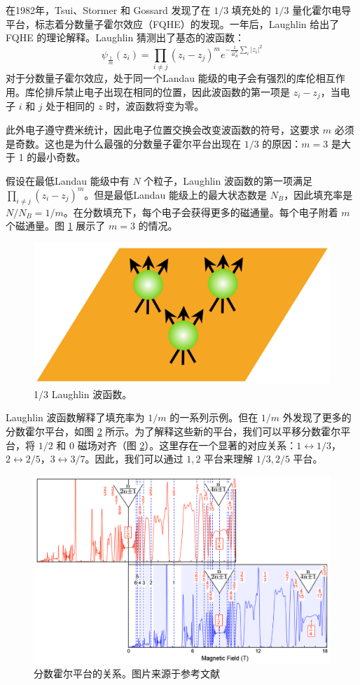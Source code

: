 在1982年，Tsui、Stormer 和 Gossard 发现了在 $1/3$ 填充处的 $1/3$ 量化霍尔电导平台\cite{PhysRevLett.48.1559}，标志着分数量子霍尔效应（FQHE）的发现。一年后，Laughlin 给出了 FQHE 的理论解释\cite{PhysRevLett.50.1395}。Laughlin 猜测出了基态的波函数：
\begin{equation}
    \psi_{\frac{1}{m}}\left(z_i\right)=\prod_{i \neq j}\left(z_i-z_j\right)^m e^{-\frac{1}{4 l_B^2} \sum_i\left|z_i\right|^2}
\end{equation}
对于分数量子霍尔效应，处于同一个Landau 能级的电子会有强烈的库伦相互作用。库伦排斥禁止电子出现在相同的位置，因此波函数的第一项是 $z_i-z_j$，当电子 $i$ 和 $j$ 处于相同的 $z$ 时，波函数将变为零。

此外电子遵守费米统计，因此电子位置交换会改变波函数的符号，这要求 $m$ 必须是奇数。这也是为什么最强的分数量子霍尔平台出现在 $1/3$ 的原因：$m=3$ 是大于 1 的最小奇数。

假设在最低Landau 能级中有 $N$ 个粒子，Laughlin 波函数的第一项满足 $\prod_{i \neq j}\left(z_i-z_j\right)^m$。但是最低Landau 能级上的最大状态数是 $N_B$，因此填充率是 $N/N_B=1/m$。在分数填充下，每个电子会获得更多的磁通量。每个电子附着 $m$ 个磁通量。图 \ref{fig:Laughlin} 展示了 $m=3$ 的情况。

\begin{figure}[htbp]
    \centering
    \includegraphics[width=0.35\linewidth]{figure/Introduction/Laughlin.png}
    \caption{1/3 Laughlin 波函数。}
    \label{fig:Laughlin}
\end{figure}

Laughlin 波函数解释了填充率为 $1/m$ 的一系列示例。但在 $1/m$ 外发现了更多的分数霍尔平台，如图 \ref{fig:plateau} 所示。为了解释这些新的平台，我们可以平移分数霍尔平台，将 $1/2$ 和 $0$ 磁场对齐（图 \ref{fig:plateau}）。这里存在一个显著的对应关系：$1\leftrightarrow1/3$，$2\leftrightarrow2/5$，$3\leftrightarrow3/7$。因此，我们可以通过 $1, 2$ 平台来理解 $1/3, 2/5$ 平台。

\begin{figure}[htbp]
    \centering
    \includegraphics[width=0.8\linewidth]{figure/Introduction/plateau.png}
    \caption{分数霍尔平台的关系。图片来源于参考文献\cite{Introduction/jain2014note}}
    \label{fig:plateau}
\end{figure}

